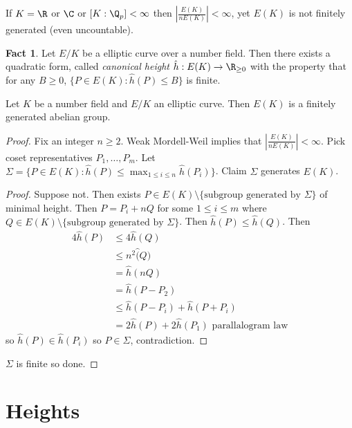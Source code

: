 \documentclass[a4paper]{article}
\theoremstyle{definition}
\newtheorem*{fact}{Fact}
\theoremstyle{theorem}
\begin{document}
\begin{remark}
  If \(K = \R\) or \(\C\) or \([K : \Q_p] < \infty\) then \(|\frac{E(K)}{nE(K)}| < \infty\), yet \(E(K)\) is not finitely generated (even uncountable).
\end{remark}

\begin{fact}
  Let \(E/K\) be a elliptic curve over a number field. Then there exists a quadratic form, called \emph{canonical height} \(\hat h: E(K) \to \R_{\geq 0}\) with the property that for any \(B \geq 0\), \(\{P \in E(K): \hat h(P) \leq B\}\) is finite.
\end{fact}

\begin{theorem}
  Let \(K\) be a number field and \(E/K\) an elliptic curve. Then \(E(K)\) is a finitely generated abelian group.
\end{theorem}

\begin{proof}
  Fix an integer \(n \geq 2\). Weak Mordell-Weil implies that \(|\frac{E(K)}{nE(K)}| < \infty\). Pick coset representatives \(P_1, \dots, P_m\). Let \(\Sigma = \{P \in E(K): \hat h(P) \leq \max_{1 \leq i \leq n} \hat h(P_i)\}\). Claim \(\Sigma\) generates \(E(K)\).

  \begin{proof}
    Suppose not. Then exists \(P \in E(K) \setminus \{\text{subgroup generated by }\Sigma\}\) of minimal height. Then \(P = P_i + nQ\) for some \(1 \leq i \leq m\) where \(Q \in E(K) \setminus \{\text{subgroup generated by } \Sigma\}\). Then \(\hat h(P) \leq \hat h(Q)\). Then
    \begin{align*}
      4 \hat h(P)
      &\leq 4 \hat h(Q) \\
      &\leq n^2 \hat(Q) \\
      &= \hat h(nQ) \\
      &= \hat h(P - P_2) \\
      &\leq \hat h(P - P_i) + \hat h(P + P_i) \\
      &= 2 \hat h(P) + 2 \hat h(P_1) \text{ parallalogram law}
    \end{align*}
    so \(\hat h(P) \in \hat h(P_i)\) so \(P \in \Sigma\), contradiction.
  \end{proof}
  \(\Sigma\) is finite so done.
\end{proof}

\section{Heights}
\end{document}
